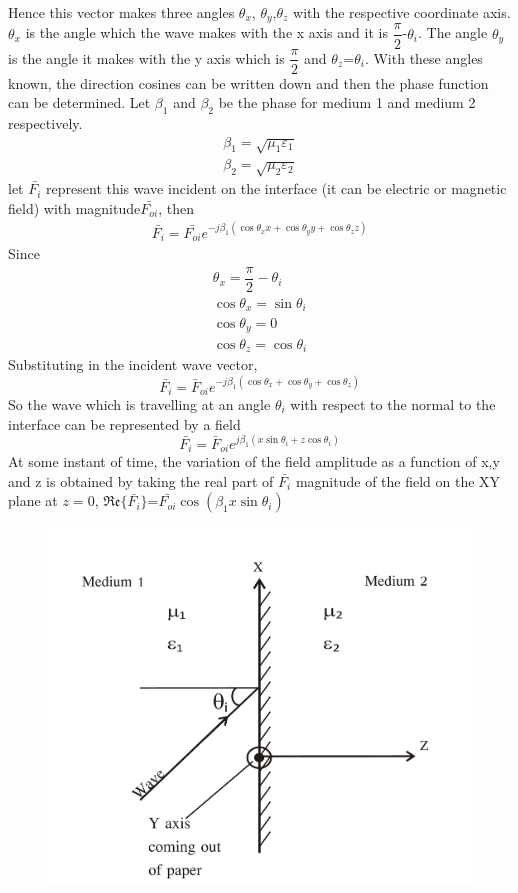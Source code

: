 Hence this vector makes three angles $\theta_x$, $\theta_y$,$\theta_z$ with the respective coordinate axis. $\theta_x$ is the angle which the wave makes with the x axis and it is $\dfrac{\pi}{2}$-$\theta_i$. The angle $\theta_y$ is the angle it makes with the y axis which is $\dfrac{\pi}{2}$ and $\theta_z$=$\theta_i$. With these angles known, the direction cosines can be written down and then the phase function can be determined. Let $\beta_1$ and $\beta_2$ be the phase for medium 1 and medium 2 respectively.
\begin{align*}
\beta_1=\sqrt{\mu_1\varepsilon_1}\\
\beta_2=\sqrt{\mu_2\varepsilon_2}
\end{align*}
let $\bar{F_i}$ represent this wave incident on the interface (it can be electric or magnetic field) with magnitude$\bar{F_{oi}}$, then
\begin{align*}
\bar{F_{i}}=\bar{F_{oi}}e^{-j\beta_1(\cos\theta_xx +\cos\theta_yy+\cos\theta_zz)}
\end{align*}
Since
\begin{align*}
\theta_x=\dfrac{\pi}{2}-\theta_i\\
\cos\theta _x=\sin \theta_i\\
\cos \theta_y=0\\
\cos\theta_z=\cos \theta_i
\end{align*}
Substituting in the incident wave vector,
$$\bar{F_i}=\bar{F}_{oi}e^{-j\beta_1(\cos \theta_x+\cos \theta_y+\cos \theta_z)}$$
So the wave  which is travelling at an angle $\theta_i$ with respect to the normal to the interface can be represented by a field
$$\bar{F_i}=\bar{F}_{oi}e^{j\beta_1(x\sin \theta_i+z\cos \theta_i)} $$
At some instant of time, the variation of the field amplitude as a function of x,y and z is obtained by taking the real part of $\bar{F_i}$ magnitude of the field on the XY plane at $z=0$, $\mathfrak{Re}\{\bar{F_i}\}$=$\bar{F_{oi}}\cos (\beta_1x\sin \theta_i)$
\begin{figure}[h]
\centering
\includegraphics[width=.8\linewidth]{./graphics/group30b}
\caption{}
\label{fig:group30b}
\end{figure}

